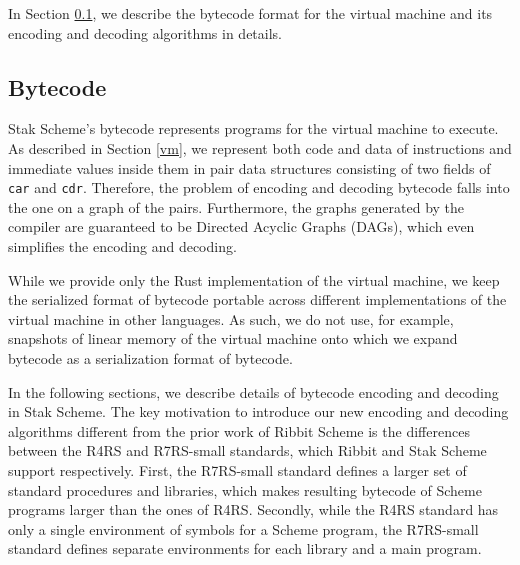 \documentclass[sigplan, anonymous, review]{acmart}
\begin{document}
In Section \ref{bytecode}, we describe the bytecode format for the
virtual machine and its encoding and decoding algorithms in details.

\subsection{Bytecode} \label{bytecode}

Stak Scheme's bytecode represents programs for the virtual machine to execute.
As described in Section \ref{vm},
we represent both code and data of instructions and immediate
values inside them in pair data structures consisting of two fields of
\texttt{car} and \texttt{cdr}.
Therefore, the problem of encoding and decoding bytecode falls into
the one on a graph of the pairs.
Furthermore, the graphs generated by the compiler are guaranteed to be
Directed Acyclic Graphs (DAGs), which even simplifies the encoding
and decoding.

While we provide only the Rust implementation of the virtual machine,
we keep the serialized format of bytecode portable across
different implementations of the virtual machine in other languages.
As such, we do not use, for example, snapshots of linear
memory of the virtual machine onto which we expand bytecode as a
serialization format of bytecode.

In the following sections, we describe details of bytecode encoding
and decoding in Stak Scheme.
The key motivation to introduce our new encoding and decoding
algorithms different from the prior work of Ribbit Scheme is the differences
between the R4RS and R7RS-small standards, which Ribbit and Stak Scheme
support respectively.
First, the R7RS-small standard defines a larger set of standard
procedures and libraries, which makes resulting bytecode of Scheme
programs larger than the ones of R4RS.
Secondly, while the R4RS standard has only a single environment of
symbols for a Scheme program, the R7RS-small standard defines
separate environments for each library and a main program.
\end{document}
